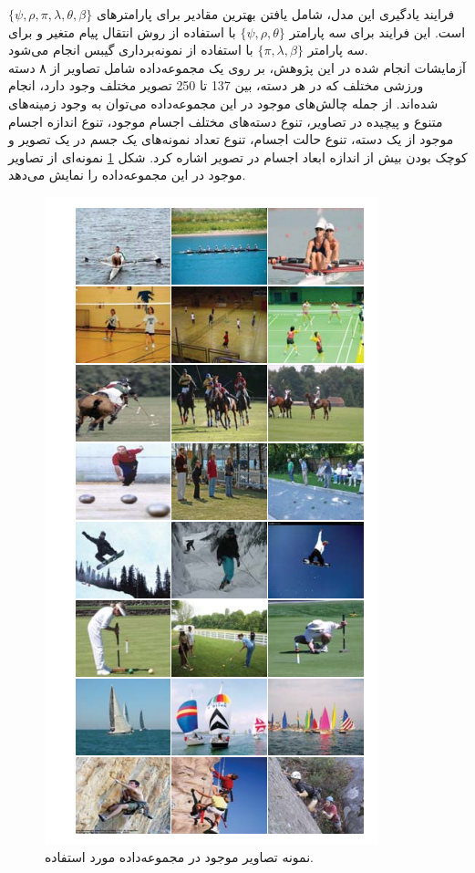 \begin{enumerate}
فرایند یادگیری این مدل، شامل یافتن بهترین مقادیر برای پارامترهای 
$\{\psi,\rho,\pi,\lambda,\theta,\beta\}$
است.
این فرایند برای سه پارامتر 
$\{\psi,\rho,\theta\}$ 
با استفاده از روش انتقال پیام متغیر و برای سه پارامتر
$\{\pi,\lambda,\beta\}$
با استفاده از نمونه‌برداری گیبس انجام می‌شود.
\\
آزمایشات انجام شده در این پژوهش، بر روی یک مجموعه‌داده شامل تصاویر از ۸ دسته ورزشی مختلف که در هر دسته، بین 137 تا 250 تصویر مختلف وجود دارد، انجام شده‌اند. از جمله چالش‌های موجود در این مجموعه‌داده می‌توان به وجود زمینه‌های متنوع و پیچیده در تصاویر، تنوع دسته‌های مختلف اجسام موجود، تنوع اندازه اجسام موجود از یک دسته، تنوع حالت اجسام، تنوع تعداد نمونه‌های یک جسم در یک تصویر و کوچک بودن بیش از اندازه ابعاد اجسام در تصویر اشاره کرد. شکل
\ref{fig:lid}
نمونه‌ای از تصاویر موجود در این مجموعه‌داده را نمایش می‌دهد.

\begin{figure}[H]
\center
\includegraphics[scale=0.95]{./Imgs/li2007and_dataset.png}
\caption{نمونه تصاویر موجود در مجموعه‌داده مورد استفاده. \cite{li2007and}}
\label{fig:lid}
\end{figure}


\end{enumerate}
